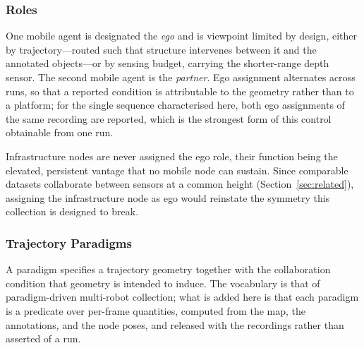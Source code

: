 \subsubsection{Roles}
One mobile agent is designated the \textit{ego} and is viewpoint limited by
design, either by trajectory---routed such that structure intervenes between it
and the annotated objects---or by sensing budget, carrying the shorter-range
depth sensor. The second mobile agent is the \textit{partner}. Ego assignment
alternates across runs, so that a reported condition is attributable to the
geometry rather than to a platform; for the single sequence characterised here,
both ego assignments of the same recording are reported, which is the strongest
form of this control obtainable from one run.

Infrastructure nodes are never assigned the ego role, their function being the
elevated, persistent vantage that no mobile node can sustain. Since comparable
datasets collaborate between sensors at a common height
(Section~\ref{sec:related}), assigning the infrastructure node as ego would
reinstate the symmetry this collection is designed to break.

\subsubsection{Trajectory Paradigms}
\label{sec:paradigms}
A paradigm specifies a trajectory geometry together with the collaboration
condition that geometry is intended to induce. The vocabulary is that of
paradigm-driven multi-robot collection; what is added here is that each paradigm
is a predicate over per-frame quantities, computed from the map, the
annotations, and the node poses, and released with the recordings rather than
asserted of a run.

